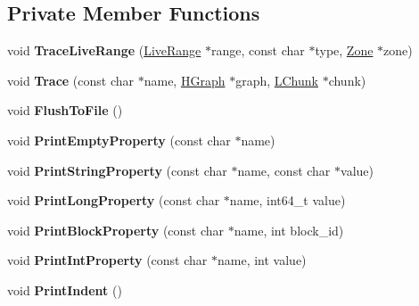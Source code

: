 \subsection*{Private Member Functions}
\begin{DoxyCompactItemize}
\item 
void {\bfseries Trace\+Live\+Range} (\hyperlink{classv8_1_1internal_1_1_live_range}{Live\+Range} $\ast$range, const char $\ast$type, \hyperlink{classv8_1_1internal_1_1_zone}{Zone} $\ast$zone)\hypertarget{classv8_1_1internal_1_1_h_tracer_a761874f29b15a57db27178105b86f928}{}\label{classv8_1_1internal_1_1_h_tracer_a761874f29b15a57db27178105b86f928}

\item 
void {\bfseries Trace} (const char $\ast$name, \hyperlink{classv8_1_1internal_1_1_h_graph}{H\+Graph} $\ast$graph, \hyperlink{classv8_1_1internal_1_1_l_chunk}{L\+Chunk} $\ast$chunk)\hypertarget{classv8_1_1internal_1_1_h_tracer_ad54bde1e18563985d093c404307de045}{}\label{classv8_1_1internal_1_1_h_tracer_ad54bde1e18563985d093c404307de045}

\item 
void {\bfseries Flush\+To\+File} ()\hypertarget{classv8_1_1internal_1_1_h_tracer_a5462b9eb7e302a7ba355d328f30d163b}{}\label{classv8_1_1internal_1_1_h_tracer_a5462b9eb7e302a7ba355d328f30d163b}

\item 
void {\bfseries Print\+Empty\+Property} (const char $\ast$name)\hypertarget{classv8_1_1internal_1_1_h_tracer_aa882f518b6c7989498c30d1f5896aca1}{}\label{classv8_1_1internal_1_1_h_tracer_aa882f518b6c7989498c30d1f5896aca1}

\item 
void {\bfseries Print\+String\+Property} (const char $\ast$name, const char $\ast$value)\hypertarget{classv8_1_1internal_1_1_h_tracer_a2c321855cce4646d3d0fe2db2e3b0ae0}{}\label{classv8_1_1internal_1_1_h_tracer_a2c321855cce4646d3d0fe2db2e3b0ae0}

\item 
void {\bfseries Print\+Long\+Property} (const char $\ast$name, int64\+\_\+t value)\hypertarget{classv8_1_1internal_1_1_h_tracer_ad04d5a3b777b25a37e44ae6da8170aaf}{}\label{classv8_1_1internal_1_1_h_tracer_ad04d5a3b777b25a37e44ae6da8170aaf}

\item 
void {\bfseries Print\+Block\+Property} (const char $\ast$name, int block\+\_\+id)\hypertarget{classv8_1_1internal_1_1_h_tracer_aedf3ec9a34dc5962a4f759e082e89a2a}{}\label{classv8_1_1internal_1_1_h_tracer_aedf3ec9a34dc5962a4f759e082e89a2a}

\item 
void {\bfseries Print\+Int\+Property} (const char $\ast$name, int value)\hypertarget{classv8_1_1internal_1_1_h_tracer_a98aea2a6e746a00fe4f52bfc6d648d1b}{}\label{classv8_1_1internal_1_1_h_tracer_a98aea2a6e746a00fe4f52bfc6d648d1b}

\item 
void {\bfseries Print\+Indent} ()\hypertarget{classv8_1_1internal_1_1_h_tracer_a4f85cc66c634f5b9a2ecffcb721f5f60}{}\label{classv8_1_1internal_1_1_h_tracer_a4f85cc66c634f5b9a2ecffcb721f5f60}

\end{DoxyCompactItemize}
